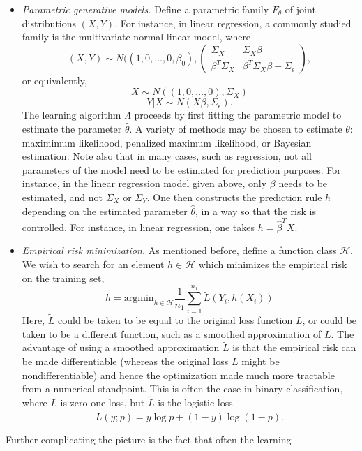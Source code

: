 \begin{itemize}
\item \emph{Parametric generative models.}  Define a parametric family
  $F_\theta$ of joint distributions $(X, Y)$.  For instance, in linear
  regression, a commonly studied family is the multivariate normal linear model,
  where
\[
(X, Y) \sim N((1,0,\hdots,0, \beta_0), \begin{pmatrix}\Sigma_X & \Sigma_X \beta \\
\beta^T \Sigma_X & \beta^T \Sigma_X \beta + \Sigma_\epsilon\end{pmatrix},
\]
or equivalently,
\[
X \sim N((1,0,\hdots,0), \Sigma_X)
\]
\[
Y|X \sim N(X \beta, \Sigma_\epsilon).
\]
The learning algorithm $\Lambda$ proceeds by first fitting the
parametric model to estimate the parameter $\hat{\theta}$.  A variety
of methods may be chosen to estimate $\theta$: maximimum likelihood,
penalized maximum likelihood, or Bayesian estimation.  Note also that
in many cases, such as regression, not all parameters of the model
need to be estimated for prediction purposes.  For instance, in the
linear regression model given above, only $\beta$ needs to be
estimated, and not $\Sigma_X$ or $\Sigma_Y$.  One then constructs the
prediction rule $h$ depending on the estimated parameter
$\hat{\theta}$, in a way so that the risk is controlled.  For
instance, in linear regression, one takes $h = \hat{\beta}^T X.$
\item \emph{Empirical risk minimization.} As mentioned before, define
  a function class $\mathcal{H}$.  We wish to search for an element $h
  \in \mathcal{H}$ which minimizes the empirical risk on the training
  set,
\[
h = \text{argmin}_{h \in \mathcal{H}} \frac{1}{n_1} \sum_{i=1}^{n_1} \tilde{L}(Y_i, h(X_i))
\]
Here, $\tilde{L}$ could be taken to be equal to the original loss
function $L$, or could be taken to be a different function, such as a
smoothed approximation of $L$.  The advantage of using a smoothed
approximation $\tilde{L}$ is that the empirical risk can be made
differentiable (whereas the original loss $L$ might be
nondifferentiable) and hence the optimization made much more tractable
from a numerical standpoint.  This is often the case in binary
classification, where $L$ is zero-one loss, but $\tilde{L}$ is the logistic loss
\[
\tilde{L}(y; p) = y \log p + (1-y) \log (1-p).
\]
\end{itemize}
Further complicating the picture is the fact that often the learning
